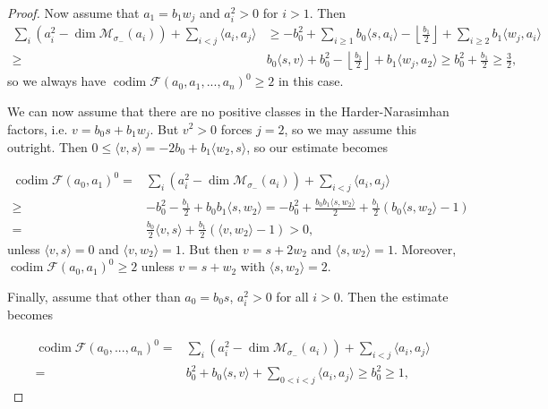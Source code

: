 \documentclass[leqno,11pt]{amsart}
\def\codim{\mathop{\mathrm{codim}}\nolimits}
\def\dim{\mathop{\mathrm{dim}}\nolimits}
\theoremstyle{definition}
\def\FF{\ensuremath{\mathcal F}}
\def\MM{\ensuremath{\mathcal M}}
\begin{document}
\begin{proof}
Now assume that $a_1=b_1 w_j$ and $a_i^2>0$ for $i>1$.  Then 
 \begin{equation}
\begin{split}
 \sum_i (a_i^2-\dim \MM_{\sigma_-}(a_i))+\sum_{i<j}\langle a_i,a_j \rangle
&\geq  -b_0^2+\sum_{i \geq 1}b_0 \langle s,a_i \rangle
-\left\lfloor\frac{b_1}{2}\right\rfloor+\sum_{i \geq 2} b_1 \langle w_j,a_i \rangle\\
\geq & b_0 \langle s,v \rangle+b_0^2
-\left\lfloor\frac{b_1}{2}\right\rfloor+b_1 \langle w_j,a_2 \rangle 
\geq  b_0^2+\frac{b_1}{2} \geq \frac{3}{2},
\end{split}
\end{equation}
so we always have $\codim\FF(a_0,a_1,...,a_n)^0\geq 2$ in this case.

We can now assume that there are no positive classes in the Harder-Narasimhan factors, i.e. $v=b_0 s+b_1 w_j$.  But $v^2>0$ forces $j=2$, so we may assume this outright.  Then $0 \leq \langle v,s \rangle=-2b_0+b_1 \langle w_2,s \rangle$, so our estimate becomes 

 \begin{equation}\label{eq: spherical 1,1 case I, c}
\begin{split}
\codim\FF(a_0,a_1)^0=&\sum_i (a_i^2-\dim \MM_{\sigma_-}(a_i))+\sum_{i<j}\langle a_i,a_j \rangle\\
\geq & -b_0^2-\frac{b_1}{2}+b_0b_1\langle s,w_2\rangle=-b_0^2+\frac{b_0b_1\langle s,w_2\rangle}{2}+\frac{b_1}{2}\left(b_0\langle s,w_2\rangle-1\right)\\
= & \frac{b_0}{2}\langle v,s\rangle+\frac{b_1}{2}\left(\langle v,w_2\rangle-1\right)> 0,
\end{split}
\end{equation}
unless $\langle v,s\rangle=0$ and $\langle v,w_2\rangle=1$.  But then $v=s+2w_2$ and $\langle s,w_2\rangle=1$.  Moreover, $\codim \FF(a_0,a_1)^0\geq 2$ unless $v=s+w_2$ with $\langle s,w_2\rangle=2$.

Finally, assume that other than $a_0=b_0 s$, $a_i^2>0$ for all $i>0$.  Then the estimate becomes 

\begin{equation}\label{eq: spherical 1,1 case I, d}
\begin{split}
\codim\FF(a_0,...,a_n)^0=&\sum_i (a_i^2-\dim \MM_{\sigma_-}(a_i))+\sum_{i<j}\langle a_i,a_j \rangle\\
= & b_0^2+b_0\langle s,v\rangle+\sum_{0<i<j}\langle a_i,a_j\rangle\geq b_0^2\geq 1,
\end{split}
\end{equation}


\end{proof}
\end{document}
